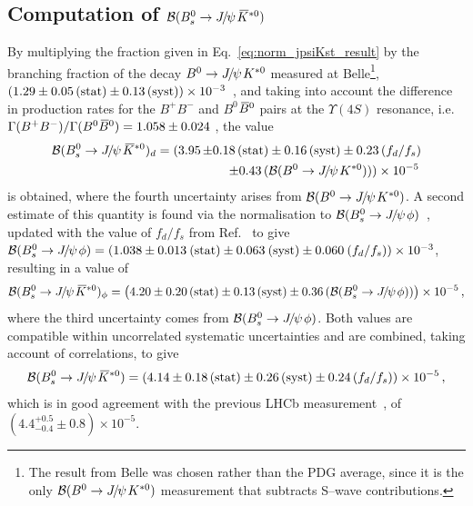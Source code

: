 \documentclass[12pt,a4paper]{article}
\def\PJ      {\ensuremath{J}\xspace}
\def\Ppsi {\ensuremath{\psi}\xspace}
\def\jpsi     {{\ensuremath{{\PJ\mskip -3mu/\mskip -2mu\Ppsi\mskip 2mu}}}\xspace}
\def\Bbar    {\kern 0.18em\overline{\kern -0.18em B}{}\xspace}
\newcommand{\Bd}{\ensuremath{B^0}\xspace}
\def\Bdb     {\ensuremath{\Bbar^0}\xspace}
\newcommand{\Bu}{\ensuremath{B^+}\xspace}
\newcommand{\Bub}{\ensuremath{B^-}\xspace}
\newcommand{\BdJpsiKst}{\ensuremath{B^0\to \jpsi K^{*0}}\xspace}
\newcommand{\BsJpsiKst}{\ensuremath{B^0_s\to \jpsi \Kstarzb}\xspace}
\newcommand{\BsJpsiPhi}{\ensuremath{B^0_s\to \jpsi \phi}\xspace}
\def\Kbar  {\kern 0.2em\overline{\kern -0.2em K}{}\xspace}
\def\Kstarzb {\ensuremath{\Kbar^{*0}}\xspace}
\newcommand{\BRof}[1]{\ensuremath{{\cal B}(#1)}\xspace}
\newcommand{\BR}{\BRof}
\newcommand{\swave}{{\rm S--wave}\xspace}
\newcommand{\equref}[1]{Eq.~\ref{#1}}
\begin{document}
\subsection{Computation of \BRof\BsJpsiKst}\label{sec:averageBsJpsiKst}

By multiplying the fraction given in \equref{eq:norm_jpsiKst_result} by the branching fraction of the decay \BdJpsiKst measured at Belle\footnote{The result from Belle was
chosen rather than the PDG average, since it is the only \BRof\BdJpsiKst measurement that subtracts \swave contributions.},
$(1.29 \pm0.05 \,({\rm stat}) \pm 0.13 \,({\rm syst)}) \times 10^{-3}$~\cite{Abe:2002haa}, and taking into account the difference in production rates for the \Bu{}\Bub and \Bd{}\Bdb pairs at the $\Upsilon(4S)$ resonance, i.e.\ $\Gamma(\Bu\Bub)/\Gamma(\Bd\Bdb) = 1.058 \pm 0.024$ \cite{HFAG}, the value
\begin{eqnarray}
\BR{\BsJpsiKst}_{d} & =  (3.95 \hspace{-0.3cm} & \pm 0.18 \, ({\rm stat}) \pm 0.16 \, ({\rm syst}) \pm 0.23 \, (f_d/f_s) \nonumber \\ 
                   &         & \pm 0.43 \,(\BRof\BdJpsiKst) )\times10^{-5} \, \nonumber
\end{eqnarray}
is obtained, where the fourth uncertainty arises from \mbox{$\BRof\BdJpsiKst$}.
A second estimate of this quantity is found via the normalisation to \BRof\BsJpsiPhi~\cite{LHCb-PAPER-2012-040}, 
 updated with the value of $f_d/f_s$ from Ref.~\cite{HFAG} to give $\BRof\BsJpsiPhi=(1.038\pm0.013\:(\text{stat})\pm 0.063\:(\text{syst})\pm 0.060\:(f_d/f_s))\times10^{-3}$, resulting in a value of
\begin{equation}
\BR{\BsJpsiKst}_{\phi} =  \left(4.20 \pm 0.20  \, \text{(stat)} \pm  0.13  \, \text{(syst)}  \pm 0.36 \, (\BRof\BsJpsiPhi)\right)\times 10^{-5} \,, \nonumber
\end{equation}
where the third uncertainty comes from $\BRof\BsJpsiPhi$. Both values
are compatible within uncorrelated systematic uncertainties and are combined, taking account of correlations, to give
\begin{equation}\label{eq:averagedBRvalue}
\BR{\BsJpsiKst} = \left(4.14 \pm 0.18 \, \text{(stat)} \pm  0.26 \, \text{(syst)} \pm 0.24 \, (f_d/f_s)\right)\times 10^{-5} \,,\nonumber
\end{equation}
which is in good agreement with the previous LHCb measurement~\cite{LHCb-PAPER-2012-014}, of $(4.4_{-0.4}^{+0.5} \pm 0.8) \times 10^{-5}$.
\end{document}
